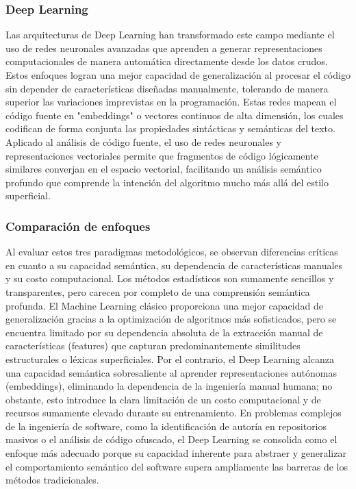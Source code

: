 \subsubsection{Deep Learning}

Las arquitecturas de Deep Learning han transformado este campo mediante el uso de redes neuronales avanzadas que aprenden a generar representaciones computacionales de manera automática directamente desde los datos crudos. Estos enfoques logran una mejor capacidad de generalización al procesar el código sin depender de características diseñadas manualmente, tolerando de manera superior las variaciones imprevistas en la programación. Estas redes mapean el código fuente en "embeddings" o vectores continuos de alta dimensión, los cuales codifican de forma conjunta las propiedades sintácticas y semánticas del texto. Aplicado al análisis de código fuente, el uso de redes neuronales y representaciones vectoriales permite que fragmentos de código lógicamente similares converjan en el espacio vectorial, facilitando un análisis semántico profundo que comprende la intención del algoritmo mucho más allá del estilo superficial.

\subsubsection{Comparación de enfoques}

Al evaluar estos tres paradigmas metodológicos, se observan diferencias críticas en cuanto a su capacidad semántica, su dependencia de características manuales y su costo computacional. Los métodos estadísticos son sumamente sencillos y transparentes, pero carecen por completo de una comprensión semántica profunda. El Machine Learning clásico proporciona una mejor capacidad de generalización gracias a la optimización de algoritmos más sofisticados, pero se encuentra limitado por su dependencia absoluta de la extracción manual de características (features) que capturan predominantemente similitudes estructurales o léxicas superficiales. Por el contrario, el Deep Learning alcanza una capacidad semántica sobresaliente al aprender representaciones autónomas (embeddings), eliminando la dependencia de la ingeniería manual humana; no obstante, esto introduce la clara limitación de un costo computacional y de recursos sumamente elevado durante su entrenamiento. En problemas complejos de la ingeniería de software, como la identificación de autoría en repositorios masivos o el análisis de código ofuscado, el Deep Learning se consolida como el enfoque más adecuado porque su capacidad inherente para abstraer y generalizar el comportamiento semántico del software supera ampliamente las barreras de los métodos tradicionales.

